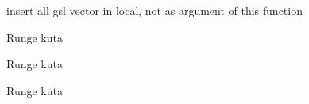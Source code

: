 
\begin{DoxyRefList}
\item[\label{todo__todo000001}%
\hypertarget{todo__todo000001}{}%
Global \hyperlink{_draw_indicators_8h_a4631bbef547576ce86515f11826cca4d}{Draw\-Indicators} (\hyperlink{struct_su_l_i_n_k}{Su\-L\-I\-N\-K} u\-L\-I\-N\-K\mbox{[}\mbox{]}, \hyperlink{struct_state}{State} $\ast$\-Status, gsl\-\_\-vector $\ast$com, gsl\-\_\-vector $\ast$\-Co\-P, int ground)]insert all gsl vector in local, not as argument of this function 
\item[\label{todo__todo000002}%
\hypertarget{todo__todo000002}{}%
Global \hyperlink{main_01_07_copie_01de_01portrob2_01en_01conflit_012012-12-20_08_8c_a0ddf1224851353fc92bfbff6f499fa97}{main} (int argc, char $\ast$argv\mbox{[}\mbox{]})]Runge kuta 

Runge kuta 

Runge kuta 
\end{DoxyRefList}
